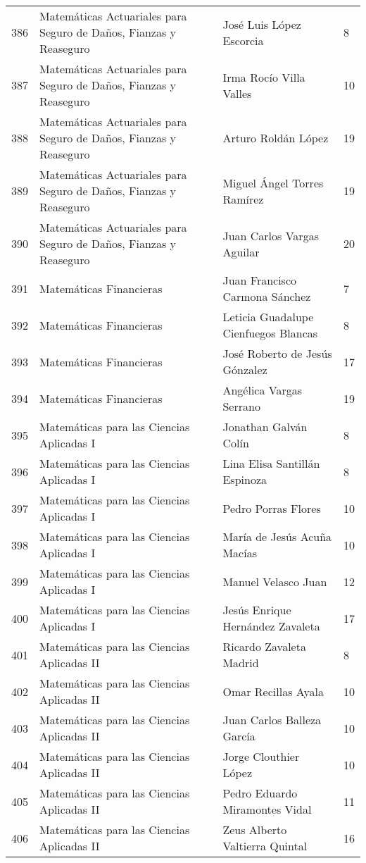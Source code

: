 \begin{table}[ht]
\begin{tabular}{rlll}
  386 & Matemáticas Actuariales para Seguro de Daños, Fianzas y Reaseguro & José Luis López Escorcia & 8 \\ 
  387 & Matemáticas Actuariales para Seguro de Daños, Fianzas y Reaseguro & Irma Rocío Villa Valles & 10 \\ 
  388 & Matemáticas Actuariales para Seguro de Daños, Fianzas y Reaseguro & Arturo Roldán López & 19 \\ 
  389 & Matemáticas Actuariales para Seguro de Daños, Fianzas y Reaseguro & Miguel Ángel Torres Ramírez & 19 \\ 
  390 & Matemáticas Actuariales para Seguro de Daños, Fianzas y Reaseguro & Juan Carlos Vargas Aguilar & 20 \\ 
  391 & Matemáticas Financieras & Juan Francisco Carmona Sánchez & 7 \\ 
  392 & Matemáticas Financieras & Leticia Guadalupe Cienfuegos Blancas & 8 \\ 
  393 & Matemáticas Financieras & José Roberto de Jesús Gónzalez & 17 \\ 
  394 & Matemáticas Financieras & Angélica Vargas Serrano & 19 \\ 
  395 & Matemáticas para las Ciencias Aplicadas I & Jonathan Galván Colín & 8 \\ 
  396 & Matemáticas para las Ciencias Aplicadas I & Lina Elisa Santillán Espinoza & 8 \\ 
  397 & Matemáticas para las Ciencias Aplicadas I & Pedro Porras Flores & 10 \\ 
  398 & Matemáticas para las Ciencias Aplicadas I & María de Jesús Acuña Macías & 10 \\ 
  399 & Matemáticas para las Ciencias Aplicadas I & Manuel Velasco Juan & 12 \\ 
  400 & Matemáticas para las Ciencias Aplicadas I & Jesús Enrique Hernández Zavaleta & 17 \\ 
  401 & Matemáticas para las Ciencias Aplicadas II & Ricardo Zavaleta Madrid & 8 \\ 
  402 & Matemáticas para las Ciencias Aplicadas II & Omar Recillas Ayala & 10 \\ 
  403 & Matemáticas para las Ciencias Aplicadas II & Juan Carlos Balleza García & 10 \\ 
  404 & Matemáticas para las Ciencias Aplicadas II & Jorge Clouthier López & 10 \\ 
  405 & Matemáticas para las Ciencias Aplicadas II & Pedro Eduardo Miramontes Vidal & 11 \\ 
  406 & Matemáticas para las Ciencias Aplicadas II & Zeus Alberto Valtierra Quintal & 16 \\ 

\end{tabular}
\end{table}
